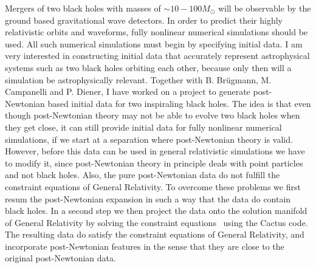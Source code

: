 \documentclass[11pt]{article}
\begin{document}
\begin{spacing}{0.95}
Mergers of two black holes with masses of $\sim 10-100M_{\odot}$ will be
observable by the ground based gravitational wave detectors.  In order to
predict their highly relativistic orbits and waveforms, fully nonlinear
numerical simulations should be used. All such numerical simulations must
begin by specifying initial data. I am very interested in constructing
initial data that accurately represent astrophysical systems such as two
black holes orbiting each other, because only then will a simulation be
astrophysically relevant. Together with B. Br\"ugmann, M. Campanelli and P.
Diener, I have worked on a project to generate post-Newtonian based initial
data for two inspiraling black holes. The idea is that even though
post-Newtonian theory may not be able to evolve two black holes when they
get close, it can still provide initial data for fully nonlinear numerical
simulations, if we start at a separation where post-Newtonian theory is
valid.
However, before this data can be used in general relativistic simulations we
have to modify it, since post-Newtonian theory in principle deals with point
particles and not black holes. Also, the pure post-Newtonian data do not
fulfill the constraint equations of General Relativity. To overcome these
problems we first resum the post-Newtonian expansion in such a way that the
data do contain black holes. In a second step we then project the data onto
the solution manifold of General Relativity by solving the constraint
equations~\cite{Tichy02} using the Cactus code. The resulting data do
satisfy the constraint equations of General Relativity, and incorporate
post-Newtonian features in the sense that they are close to the original
post-Newtonian data.




\end{spacing}
\end{document}
